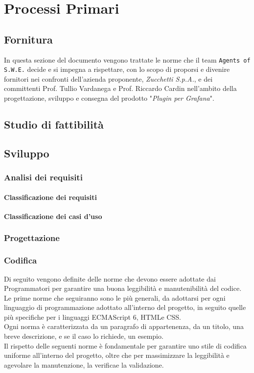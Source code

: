\section{Processi Primari}

\subsection{Fornitura}
In questa sezione del documento vengono trattate le norme che il team \texttt{Agents of S.W.E.} decide e si impegna a rispettare, con lo scopo di proporsi e divenire fornitori nei confronti dell'azienda proponente, \textit{Zucchetti S.p.A.}, e dei committenti Prof. Tullio Vardanega e Prof. Riccardo Cardin nell'ambito della progettazione, sviluppo e consegna del prodotto "\textit{Plugin per Grafana}".

\subsection{Studio di fattibilità}


\subsection{Sviluppo}
\subsubsection{Analisi dei requisiti}
\paragraph{Classificazione dei requisiti}
\paragraph{Classificazione dei casi d'uso}

\subsubsection{Progettazione}
\subsubsection{Codifica}
Di seguito vengono definite delle norme che devono essere adottate dai Programmatori per garantire una buona leggibilità  e manutenibilità  del codice. Le prime norme che seguiranno sono le più generali, da adottarsi per ogni linguaggio di programmazione adottato all'interno del progetto, in seguito quelle più specifiche per i linguaggi ECMAScript 6\glossario, HTML\glossario e CSS\glossario.\\
Ogni norma è caratterizzata da un paragrafo di appartenenza, da un titolo, una breve descrizione, e se il caso lo richiede, un esempio.\\
Il rispetto delle seguenti norme è fondamentale per garantire uno stile di codifica uniforme all'interno del progetto, oltre che per massimizzare la leggibilità  e agevolare la manutenzione, la verifica\glossario e la validazione\glossario.

